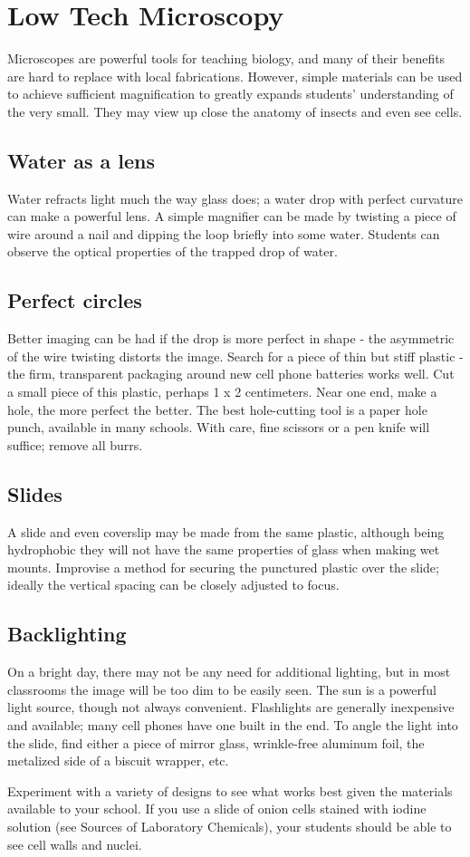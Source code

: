 \chapter{Low Tech Microscopy}

Microscopes are powerful tools for teaching biology, and many of their benefits are hard to replace with local fabrications. However, simple materials can be used to achieve sufficient magnification to greatly expands students' understanding of the very small. They may view up close the anatomy of insects and even see cells.

\section{Water as a lens}
Water refracts light much the way glass does; a water drop with perfect curvature can make a powerful lens. A simple magnifier can be made by twisting a piece of wire around a nail and dipping the loop briefly into some water. Students can observe the optical properties of the trapped drop of water.

\section{Perfect circles}
Better imaging can be had if the drop is more perfect in shape - the asymmetric of the wire twisting distorts the image. Search for a piece of thin but stiff plastic - the firm, transparent packaging around new cell phone batteries works well. Cut a small piece of this plastic, perhaps 1 x 2 centimeters. Near one end, make a hole, the more perfect the better. The best hole-cutting tool is a paper hole punch, available in many schools. With care, fine scissors or a pen knife will suffice; remove all burrs.

\section{Slides}
A slide and even coverslip may be made from the same plastic, although being hydrophobic they will not have the same properties of glass when making wet mounts. Improvise a method for securing the punctured plastic over the slide; ideally the vertical spacing can be closely adjusted to focus.

\section{Backlighting}
On a bright day, there may not be any need for additional lighting, but in most classrooms the image will be too dim to be easily seen. The sun is a powerful light source, though not always convenient. Flashlights are generally inexpensive and available; many cell phones have one built in the end. To angle the light into the slide, find either a piece of mirror glass, wrinkle-free aluminum foil, the metalized side of a biscuit wrapper, etc.

Experiment with a variety of designs to see what works best given the materials available to your school. If you use a slide of onion cells stained with iodine solution (see Sources of Laboratory Chemicals), your students should be able to see cell walls and nuclei.
